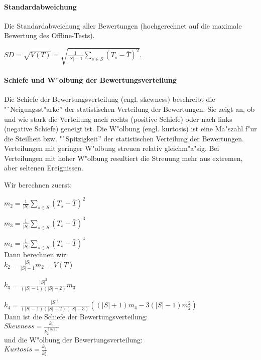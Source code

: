\documentclass[12pt]{report}
\begin{document}
\paragraph{Standardabweichung}
Die Standardabweichung aller Bewertungen (hochgerechnet auf die maximale Bewertung des Offline-Tests).

$SD = \sqrt{V(T)} = \sqrt{\frac{1}{|S| - 1}\sum\limits_{s\in S}(T_s - \bar{T})^2}$.

\paragraph{Schiefe und W"olbung der Bewertungsverteilung}

Die Schiefe der Bewertungsverteilung (engl. skewness) beschreibt die "`Neigungsst"arke'' der statistischen Verteilung der Bewertungen. Sie zeigt an, ob und wie stark die Verteilung nach rechts (positive Schiefe) oder nach links (negative Schiefe) geneigt ist.
Die W"olbung (engl. kurtosis) ist eine Ma"szahl f"ur die Steilheit bzw. "`Spitzigkeit'' der statistischen Verteilung der Bewertungen. Verteilungen mit geringer W"olbung streuen relativ gleichm"a"sig. Bei Verteilungen mit hoher W"olbung resultiert die Streuung mehr aus extremen, aber seltenen Ereignissen.

Wir berechnen zuerst:

$m_2=\frac{1}{|S|}\sum\limits_{s\in S}{(T_s - \bar{T})^2}$

$m_3=\frac{1}{|S|}\sum\limits_{s\in S}{(T_s - \bar{T})^3}$

$m_4=\frac{1}{|S|}\sum\limits_{s\in S}{(T_s - \bar{T})^4}$\\

Dann berechnen wir:\\

$k_2 = \frac{|S|}{|S| - 1}m_2 = V(T)$

$k_3 = \frac{|S|^2}{(|S|-1)(|S|-2)} m_3$

$k_4 = \frac{|S|^2}{(|S|-1)(|S|-2)(|S|-3)}\left((|S|+1)m_4-3(|S|-1)m_2^2\right)$\\

Dann ist die Schiefe der Bewertungsverteilung:\\

 $Skewness = \frac{k_3}{k_2^(3/2)}$\\

und die W"olbung der Bewertungsverteilung:\\

 $Kurtosis = \frac{k_4}{k_2^2}$
\end{document}
